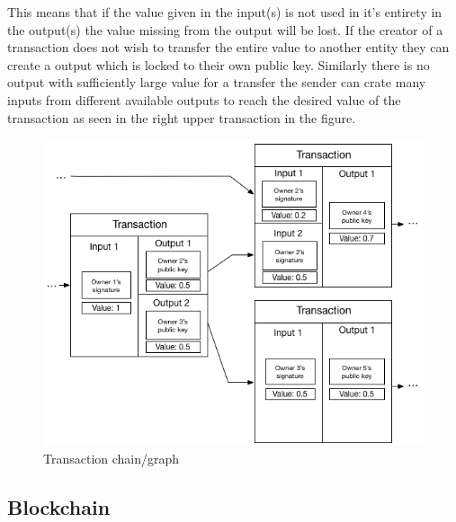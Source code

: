 This means that if the value given in the input(s) is not used in it's entirety in the output(s) the value missing from the output will be lost. If the creator of a transaction does not wish to transfer the entire value to another entity they can create a output which is locked to their own public key. Similarly there is no output with sufficiently large value for a transfer the sender can crate many inputs from different available outputs to reach the desired value of the transaction as seen in the right upper transaction in the figure.


\begin{figure}[h]  %
  \centering
  \includegraphics[width=.7\textwidth]{figures/transaction}
  \caption[Transaction chain]{Transaction chain/graph}
  \label{fig:transaction_graph}
\end{figure}


\subsection{Blockchain}
\label{subsec:blockchain}

